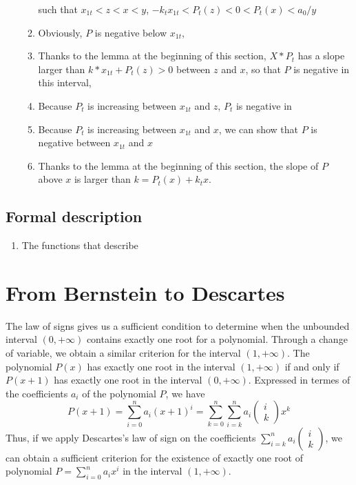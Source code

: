 \documentclass{article}
\begin{document}
\begin{enumerate}
\begin{enumerate}
 such that \(x_{1t} < z < x < y\), \(- k_t x_{1t} < P_t(z) < 0 < P_t(x) < a_0/y\)
\item Obviously, \(P\) is negative below \(x_{1t}\),
\item Thanks to the lemma at the beginning of this section, 
\(X * P_t\) has a slope larger than \(k * x_{1t} + P_t(z) > 0\) between
\(z\) and \(x\), so that \(P\) is negative in this interval,
\item Because \(P_t\) is increasing between \(x_{1t}\) and \(z\), \(P_t\) is
negative in
\item Because \(P_t\) is increasing between \(x_{1t}\) and \(x\), we can show
that \(P\) is negative between \(x_{1t}\) and \(x\)
\item  Thanks to the lemma at the beginning of this section,
the slope of \(P\) above \(x\) is larger than
\(k = P_t(x) + k_t x\).
\end{enumerate}
\end{enumerate}
\subsection{Formal description}
\begin{enumerate}
\item The functions that describe
\end{enumerate}
\section{From Bernstein to Descartes}
The law of signs gives us a sufficient condition to determine when the
unbounded interval \((0,+\infty)\) contains exactly one root for a
polynomial. Through a change of variable, we obtain a similar
criterion for the interval \((1, +\infty)\).  The polynomial \(P(x)\)
has exactly one root in the interval \((1,+\infty)\) if and only if
\(P(x+1)\) has exactly one root in the interval \((0,+\infty)\).
Expressed in termes of the coefficients \(a_i\) of the polynomial
\(P\), we have 
\[P(x+1)= \sum_{i=0}^{n} a_i (x+1)^i = \sum_{k=0}^{n} \sum_{i=k}^{n}a_i\left(\begin{array}{c}i\\k\end{array}\right) x^k\]
Thus, if we apply Descartes's law of sign on the coefficients \(\sum_{i=k}^{n}a_i\left(\begin{array}{c}i\\k\end{array}\right)\), we can obtain a sufficient criterion for the existence of exactly one root of polynomial 
\(P=\sum_{i=0}^{n}a_ix^i\) in the interval \((1,+\infty)\).
\end{document}
